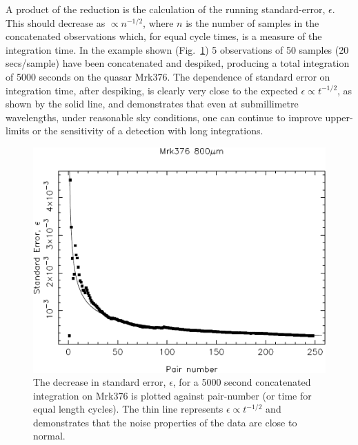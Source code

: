 \documentclass{article}
\begin{document}
A product of the reduction is the calculation of the running standard-error,
$\epsilon $. This should decrease as $\propto n^{-1/2}$, where $n$ is the
number of samples in the concatenated observations which, for equal cycle
times, is a measure of the integration time. In the example shown (Fig.~\ref{fig:error})
5 observations of 50 samples (20
secs/sample) have been concatenated and despiked, producing a total
integration of 5000 seconds
on the quasar Mrk376. The dependence of standard error on integration time,
after despiking,
is clearly very close to the expected $\epsilon \propto t^{-1/2}$, as shown by
the solid line, and demonstrates that even at submillimetre wavelengths, under
reasonable sky conditions, one can continue to improve upper-limits or
the sensitivity of a detection with long integrations.


\begin{figure}[ht]
\includegraphics[width=\textwidth]{mtun144fig2}
\caption{
The decrease in standard error, $\epsilon$, for a 5000 second concatenated
integration on Mrk376 is plotted against pair-number (or time for equal
length cycles). The thin line represents $\epsilon \propto t^{-1/2}$ and
demonstrates that the noise properties of the data are close to normal.}
\label{fig:error}
\end{figure}
\end{document}
